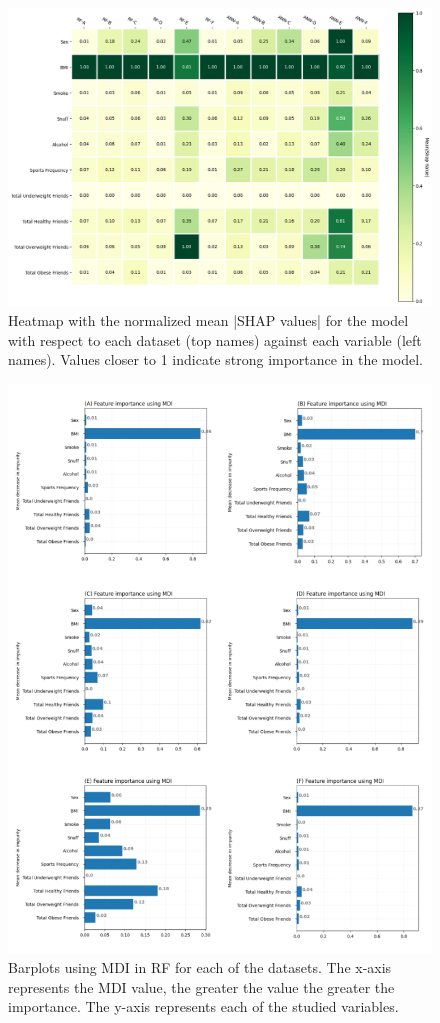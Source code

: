     \begin{figure}[ht]
        \centering
            \includegraphics[width=0.9\linewidth]{figures/Results/ResultThree/Heatmap2.png } 
        \caption{Heatmap with the normalized mean |SHAP values| for the model with respect to each dataset (top names) against each variable (left names). Values closer to 1 indicate strong importance in the model.}
        \label{figure:Results3A}
    \end{figure}

    \begin{figure}[ht]
        \centering
            \includegraphics[width=0.9\linewidth]{figures/Results/ResultThree/MDIs.png } 
        \caption{Barplots using MDI in RF for each of the datasets. The x-axis represents the MDI value, the greater the value the greater the importance. The y-axis represents each of the studied variables.}
        \label{figure:Results3B}
    \end{figure}

